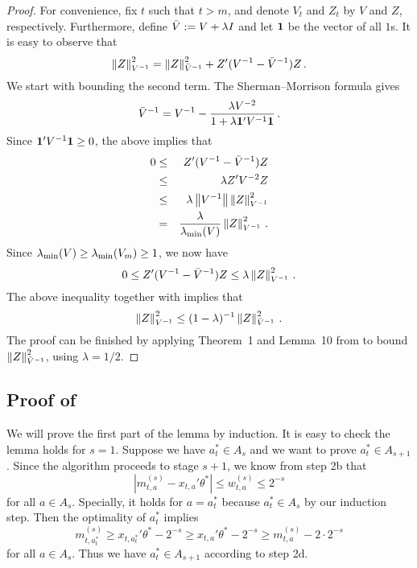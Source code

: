 \begin{proof}
For convenience, fix $t$ such that $t>m$, and denote $V_t$ and $Z_t$ by $V$ and $Z$, respectively.  Furthermore, define $\bar{V} := V+\lambda I$ and let $\mathbf{1}$ be the vector of all $1$s.  It is easy to observe that
\begin{equation}
\left\|Z\right\|_{V^{-1}}^2 = \left\|Z\right\|_{\bar{V}^{-1}}^2 + Z'(V^{-1} - \bar{V}^{-1})Z\,.
\label{eqn:znorm-decomposition}
\end{equation}
%
We start with bounding the second term.  The Sherman–Morrison formula gives
\[
\bar{V}^{-1} = V^{-1} - \frac{\lambda V^{-2}}{1+\lambda \mathbf{1}'V^{-1}\mathbf{1}}\,.
\]
Since $\mathbf{1}'V^{-1}\mathbf{1}\ge0$, the above implies that
\begin{eqnarray*}
0 &\le& Z'(V^{-1} - \bar{V}^{-1})Z \\
&\le& \lambda Z' V^{-2} Z \\
&\le& \lambda \left\|V^{-1}\right\| \left\|Z\right\|_{V^{-1}}^2 \\
&=& \frac{\lambda}{\lambda_{\min}(V)}\left\|Z\right\|_{V^{-1}}^2\,.
\end{eqnarray*}
Since $\lambda_{\min}(V) \ge \lambda_{\min}(V_m) \ge 1$, we now have
\[
0 \le Z'(V^{-1} - \bar{V}^{-1})Z \le \lambda \left\|Z\right\|_{V^{-1}}^2\,.
\]
The above inequality together with  implies that
\[
\left\|Z\right\|_{V^{-1}}^2 \le (1-\lambda)^{-1} \left\|Z\right\|_{\bar{V}^{-1}}^2\,.
\]
The proof can be finished by applying Theorem~1 and Lemma~10 from \citet{abbasi2011improved} to bound $\left\|Z\right\|_{\bar{V}^{-1}}^2$, using $\lambda=1/2$.
\end{proof} 

\subsection{Proof of }

We will prove the first part of the lemma by induction. It is easy to check the lemma holds for $s=1$. Suppose we have $a_t^* \in A_s$ and we want to prove $a_t^* \in A_{s+1}$. Since the algorithm proceeds to stage $s+1$, we know from step 2b that
$$|m_{t,a}^{(s)} - x_{t,a}'\theta^*| \le w_{t,a}^{(s)} \le 2^{-s}$$
for all $a \in A_{s}$. Specially, it holds for $a=a_t^*$ because $a_t^* \in A_{s}$ by our induction step. Then the optimality of $a_t^*$ implies
$$ m_{t,a_t^*}^{(s)} \ge  x_{t,a_t^*}'\theta^* - 2^{-s} \ge x_{t,a}'\theta^* - 2^{-s} \ge m_{t,a}^{(s)} - 2\cdot2^{-s}$$
for all $a \in A_s$. Thus we have $a_t^* \in A_{s+1}$ according to step 2d.

